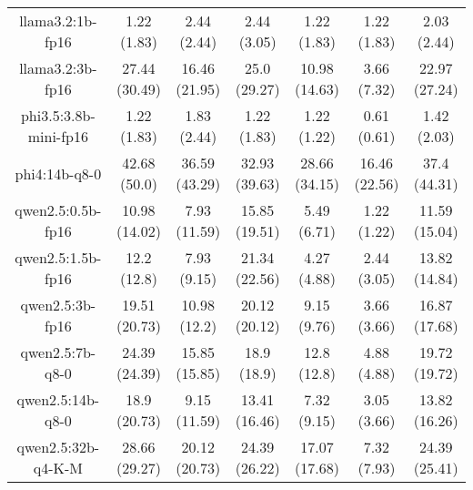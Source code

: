 \begin{table}[]
{\begin{tabular}{ccccccc}
        \multicolumn{1}{c|}{llama3.2:1b-fp16} & 1.22 (1.83) & 2.44 (2.44) & \multicolumn{1}{c|}{2.44 (3.05)} & 1.22 (1.83) & \multicolumn{1}{c|}{1.22 (1.83)} & 2.03 (2.44) \\
        

        \multicolumn{1}{c|}{llama3.2:3b-fp16} & 27.44 (30.49) & 16.46 (21.95) & \multicolumn{1}{c|}{25.0 (29.27)} & 10.98 (14.63) & \multicolumn{1}{c|}{3.66 (7.32)} & 22.97 (27.24) \\
        

        \multicolumn{1}{c|}{phi3.5:3.8b-mini-fp16} & 1.22 (1.83) & 1.83 (2.44) & \multicolumn{1}{c|}{1.22 (1.83)} & 1.22 (1.22) & \multicolumn{1}{c|}{0.61 (0.61)} & 1.42 (2.03) \\
        

        \multicolumn{1}{c|}{phi4:14b-q8-0} & 42.68 (50.0) & 36.59 (43.29) & \multicolumn{1}{c|}{32.93 (39.63)} & 28.66 (34.15) & \multicolumn{1}{c|}{16.46 (22.56)} & 37.4 (44.31) \\
        

        \multicolumn{1}{c|}{qwen2.5:0.5b-fp16} & 10.98 (14.02) & 7.93 (11.59) & \multicolumn{1}{c|}{15.85 (19.51)} & 5.49 (6.71) & \multicolumn{1}{c|}{1.22 (1.22)} & 11.59 (15.04) \\
        

        \multicolumn{1}{c|}{qwen2.5:1.5b-fp16} & 12.2 (12.8) & 7.93 (9.15) & \multicolumn{1}{c|}{21.34 (22.56)} & 4.27 (4.88) & \multicolumn{1}{c|}{2.44 (3.05)} & 13.82 (14.84) \\
        

        \multicolumn{1}{c|}{qwen2.5:3b-fp16} & 19.51 (20.73) & 10.98 (12.2) & \multicolumn{1}{c|}{20.12 (20.12)} & 9.15 (9.76) & \multicolumn{1}{c|}{3.66 (3.66)} & 16.87 (17.68) \\
        

        \multicolumn{1}{c|}{qwen2.5:7b-q8-0} & 24.39 (24.39) & 15.85 (15.85) & \multicolumn{1}{c|}{18.9 (18.9)} & 12.8 (12.8) & \multicolumn{1}{c|}{4.88 (4.88)} & 19.72 (19.72) \\
        

        \multicolumn{1}{c|}{qwen2.5:14b-q8-0} & 18.9 (20.73) & 9.15 (11.59) & \multicolumn{1}{c|}{13.41 (16.46)} & 7.32 (9.15) & \multicolumn{1}{c|}{3.05 (3.66)} & 13.82 (16.26) \\
        

        \multicolumn{1}{c|}{qwen2.5:32b-q4-K-M} & 28.66 (29.27) & 20.12 (20.73) & \multicolumn{1}{c|}{24.39 (26.22)} & 17.07 (17.68) & \multicolumn{1}{c|}{7.32 (7.93)} & 24.39 (25.41) \\
        


\end{tabular}}
\end{table}

